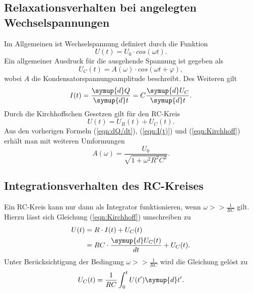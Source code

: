 \subsection{Relaxationsverhalten bei angelegten Wechselspannungen}
Im Allgemeinen ist Wechselspannung definiert durch die Funktion
\begin{equation*}
    U(t)=U_0 \cdot cos(\omega t).
\end{equation*}
Ein allgemeiner Ausdruck für die ausgehende Spannung ist gegeben als
\begin{equation*}
    U_{C}(t)=A(\omega)\cdot cos(\omega t +\varphi),
\end{equation*}
wobei $A$ die Kondensatorspannungsamplitude beschreibt.
Des Weiteren gilt
\begin{equation}
    \label{eqn:I(t)}
    I(t)=\frac{\symup{d}Q}{\symup{d}t}=C\frac{\symup{d}U_C}{\symup{d}t}.
\end{equation}
Durch die Kirchhoffschen Gesetzen gilt für den RC-Kreis
\begin{equation}
    \label{eqn:Kirchhoff}
    U(t)=U_{R}(t)+U_{C}(t).
\end{equation}
Aus den vorherigen Formeln (\ref{eqn:dQ/dt}), (\ref{eqn:I(t)}) und (\ref{eqn:Kirchhoff}) erhält man mit weiteren Umformungen
\begin{equation}
    \label{eqn:Amplitude}
    A(\omega)=\frac{U_0}{\sqrt{1+\omega^2 R^2 C^2}}.
\end{equation}


\subsection{Integrationsverhalten des RC-Kreises}
\label{subsec:int}
Ein RC-Kreis kann nur dann als Integrator funktionieren, wenn $\omega >> \frac{1}{RC}$ gilt.
Hierzu lässt sich Gleichung (\ref{eqn:Kirchhoff}) umschreiben zu
\begin{align*}
    U(t)&=R \cdot I(t)+U_{C}(t)\\
        &=RC\cdot \frac{\symup{d}U_{C}(t)}{dt}+U_{C}(t).
\end{align*}
Unter Berücksichtigung der Bedingung $\omega >>\frac{1}{RC}$ wird die Gleichung gelöst zu
\begin{equation}
    \label{eqn:Kondensatorspannung}
    U_{C}(t)=\frac{1}{RC}\int_{0}^{t} U(t')\symup{d}t'.
\end{equation}